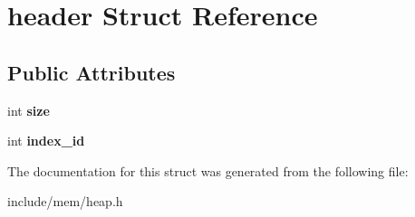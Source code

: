\hypertarget{structheader}{}\section{header Struct Reference}
\label{structheader}
\subsection*{Public Attributes}
\begin{DoxyCompactItemize}
\item 
int {\bfseries size}\hypertarget{structheader_af8cc659f702446226bc2ebabba437d5d}{}\label{structheader_af8cc659f702446226bc2ebabba437d5d}

\item 
int {\bfseries index\+\_\+id}\hypertarget{structheader_aec42bcd6139d12f84d54b5e6a149b276}{}\label{structheader_aec42bcd6139d12f84d54b5e6a149b276}

\end{DoxyCompactItemize}


The documentation for this struct was generated from the following file\+:\begin{DoxyCompactItemize}
\item 
include/mem/heap.\+h\end{DoxyCompactItemize}
